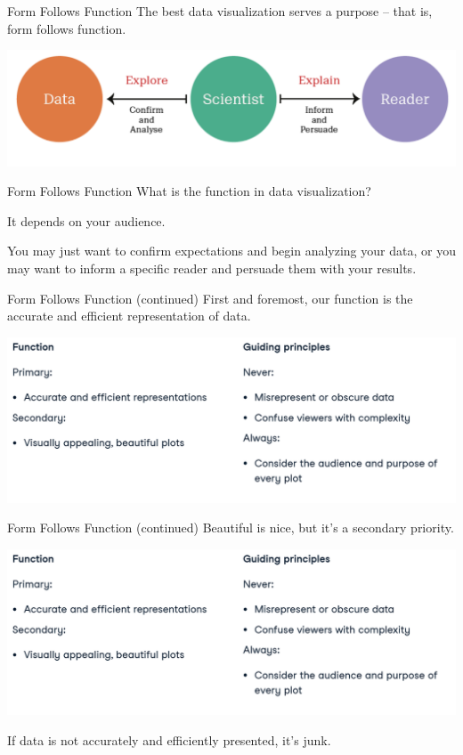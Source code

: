\documentclass[
  ignorenonframetext,
]{beamer}
\begin{document}
\begin{frame}{Form Follows Function}
\label{form-follows-function}
The best data visualization serves a purpose -- that is, form follows
function.

\includegraphics{../images/im166.png}
\end{frame}

\begin{frame}{Form Follows Function}
\label{form-follows-function-1}
What is the function in data visualization?

It depends on your audience.

You may just want to confirm expectations and begin analyzing your data,
or you may want to inform a specific reader and persuade them with your
results.
\end{frame}

\begin{frame}{Form Follows Function (continued)}
\label{form-follows-function-continued}
First and foremost, our function is the accurate and efficient
representation of data.

\includegraphics{../images/im167.png}
\end{frame}

\begin{frame}{Form Follows Function (continued)}
\label{form-follows-function-continued-1}
Beautiful is nice, but it's a secondary priority.

\includegraphics{../images/im167.png}

If data is not accurately and efficiently presented, it's junk.
\end{frame}
\end{document}
